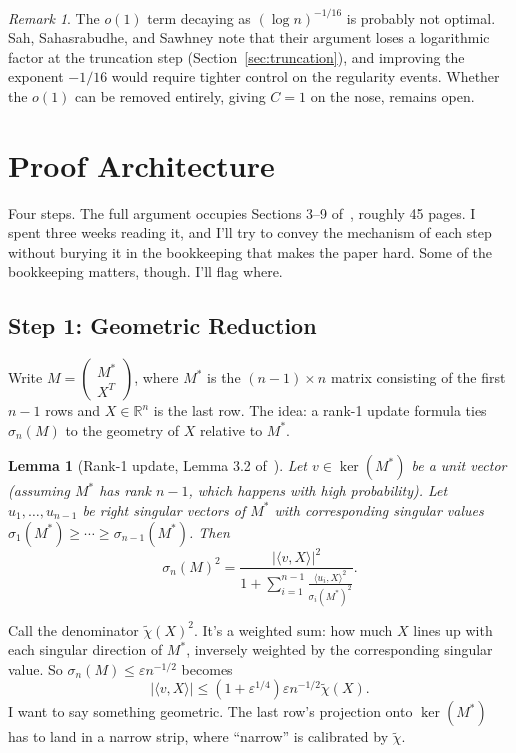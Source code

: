 \documentclass[11pt]{article}
\newtheorem{lemma}[theorem]{Lemma}
\theoremstyle{definition}
\theoremstyle{remark}
\newtheorem{remark}[theorem]{Remark}
\newcommand{\R}{\mathbb{R}}
\begin{document}
\begin{remark}
The $o(1)$ term decaying as $(\log n)^{-1/16}$ is probably not optimal.
Sah, Sahasrabudhe, and Sawhney note that their argument loses a logarithmic factor
at the truncation step (Section~\ref{sec:truncation}), and improving the exponent $-1/16$
would require tighter control on the regularity events. Whether the $o(1)$ can be
removed entirely, giving $C = 1$ on the nose, remains open.
\end{remark}

\section{Proof Architecture}
\label{sec:proof-arch}

Four steps. The full argument occupies Sections 3--9 of~\cite{sah2024spielman}, roughly 45 pages.
I spent three weeks reading it, and I'll try to convey the mechanism of each step without burying it in the bookkeeping that makes the paper hard.
Some of the bookkeeping matters, though. I'll flag where.

\subsection{Step 1: Geometric Reduction}
\label{sec:geometric}

Write $M = \begin{pmatrix} M^* \\ X^T \end{pmatrix}$, where $M^*$ is the
$(n-1) \times n$ matrix consisting of the first $n-1$ rows and $X \in \R^n$
is the last row. The idea: a rank-1 update formula ties $\sigma_n(M)$ to
the geometry of $X$ relative to $M^*$.

\begin{lemma}[Rank-1 update, Lemma 3.2 of~\cite{sah2024spielman}]
\label{lem:rank1}
Let $v \in \ker(M^*)$ be a unit vector (assuming $M^*$ has rank $n-1$, which
happens with high probability). Let $u_1, \ldots, u_{n-1}$ be right singular
vectors of $M^*$ with corresponding singular values $\sigma_1(M^*) \ge \cdots
\ge \sigma_{n-1}(M^*)$. Then
\[
  \sigma_n(M)^2 = \frac{|\langle v, X \rangle|^2}{1 + \sum_{i=1}^{n-1}
  \frac{\langle u_i, X \rangle^2}{\sigma_i(M^*)^2}}.
\]
\end{lemma}

Call the denominator $\tilde{\chi}(X)^2$. It's a weighted sum: how much $X$ lines up with each singular direction of $M^*$, inversely weighted by the corresponding singular value.
So $\sigma_n(M) \le \varepsilon n^{-1/2}$ becomes
\[
  |\langle v, X \rangle| \le (1 + \varepsilon^{1/4}) \varepsilon n^{-1/2} \tilde{\chi}(X).
\]
I want to say something geometric.
The last row's projection onto $\ker(M^*)$ has to land in a narrow strip, where ``narrow'' is calibrated by $\tilde{\chi}$.
\end{document}
